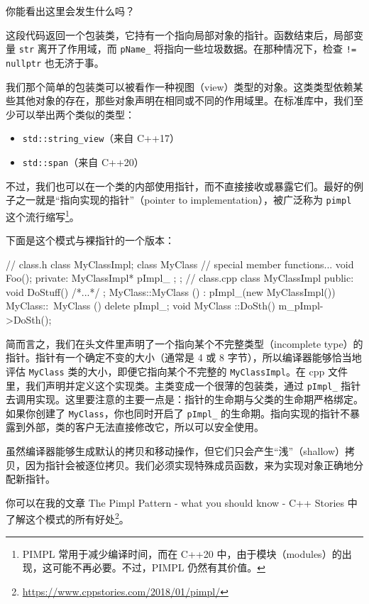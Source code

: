 你能看出这里会发生什么吗？

这段代码返回一个包装类，它持有一个指向局部对象的指针。函数结束后，局部变量 \texttt{str} 离开了作用域，而 \texttt{pName\_} 将指向一些垃圾数据。在那种情况下，检查 \texttt{!= nullptr} 也无济于事。

我们那个简单的包装类可以被看作一种视图（view）类型的对象。这类类型依赖某些其他对象的存在，那些对象声明在相同或不同的作用域里。在标准库中，我们至少可以举出两个类似的类型：

\begin{itemize}
\item \texttt{std::string\_view}（来自 C++17）
\item \texttt{std::span}（来自 C++20）
\end{itemize}

不过，我们也可以在一个类的内部使用指针，而不直接接收或暴露它们。最好的例子之一就是“指向实现的指针”（pointer to implementation），被广泛称为 \texttt{pimpl} 这个流行缩写\footnote{PIMPL 常用于减少编译时间，而在 C++20 中，由于模块（modules）的出现，这可能不再必要。不过，PIMPL 仍然有其价值。}。

下面是这个模式与裸指针的一个版本：

\begin{codebox}[cpp]
// class.h
class MyClassImpl;
class MyClass {
// special member functions...
void Foo();
private:
MyClassImpl* pImpl_ {};
};
// class.cpp
class MyClassImpl
{
public:
void DoStuff() { /*...*/ }
};
MyClass::MyClass ()
: pImpl_(new MyClassImpl())
{ }
MyClass::~MyClass () { delete pImpl_; }
void MyClass ::DoSth() {
m_pImpl->DoSth();
}
\end{codebox}

简而言之，我们在头文件里声明了一个指向某个不完整类型（incomplete type）的指针。指针有一个确定不变的大小（通常是 4 或 8 字节），所以编译器能够恰当地评估 \texttt{MyClass} 类的大小，即便它指向某个不完整的 \texttt{MyClassImpl}。在 cpp 文件里，我们声明并定义这个实现类。主类变成一个很薄的包装类，通过 \texttt{pImpl\_} 指针去调用实现。这里要注意的主要一点是：指针的生命期与父类的生命期严格绑定。如果你创建了 \texttt{MyClass}，你也同时开启了 \texttt{pImpl\_} 的生命期。指向实现的指针不暴露到外部，类的客户无法直接修改它，所以可以安全使用。

虽然编译器能够生成默认的拷贝和移动操作，但它们只会产生“浅”（shallow）拷贝，因为指针会被逐位拷贝。我们必须实现特殊成员函数，来为实现对象正确地分配新指针。

你可以在我的文章 The Pimpl Pattern - what you should know - C++ Stories 中了解这个模式的所有好处\footnote{\url{https://www.cppstories.com/2018/01/pimpl/}}。

